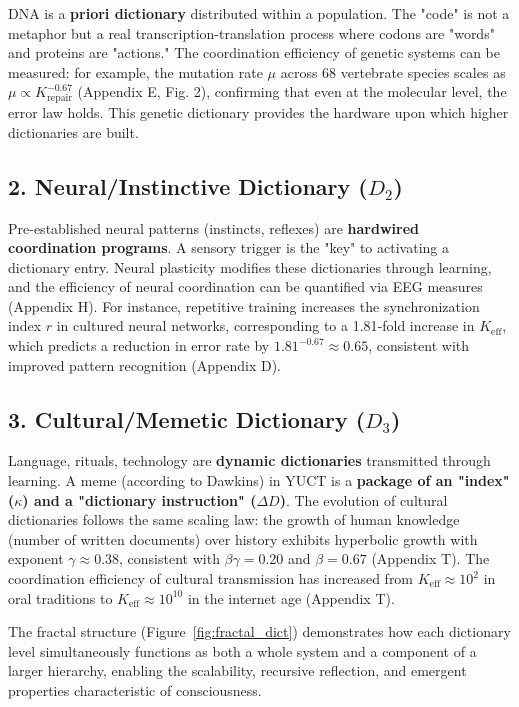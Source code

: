 \documentclass[12pt,a4paper]{article}
\newcommand{\eff}{\mathrm{eff}}
\newcommand{\Ke}{K_{\eff}}
\begin{document}
	DNA is a \textbf{priori dictionary} distributed within a population. The "code" is not a metaphor but a real transcription-translation process where codons are "words" and proteins are "actions." The coordination efficiency of genetic systems can be measured: for example, the mutation rate $\mu$ across 68 vertebrate species scales as $\mu \propto K_{\text{repair}}^{-0.67}$ (Appendix E, Fig. 2), confirming that even at the molecular level, the error law holds. This genetic dictionary provides the hardware upon which higher dictionaries are built.
	
	\subsection{2. Neural/Instinctive Dictionary ($D_2$)}
	
	Pre-established neural patterns (instincts, reflexes) are \textbf{hardwired coordination programs}. A sensory trigger is the "key" to activating a dictionary entry. Neural plasticity modifies these dictionaries through learning, and the efficiency of neural coordination can be quantified via EEG measures (Appendix H). For instance, repetitive training increases the synchronization index $r$ in cultured neural networks, corresponding to a 1.81‑fold increase in $\Ke$, which predicts a reduction in error rate by $1.81^{-0.67} \approx 0.65$, consistent with improved pattern recognition (Appendix D).
	
	\subsection{3. Cultural/Memetic Dictionary ($D_3$)}
	
	Language, rituals, technology are \textbf{dynamic dictionaries} transmitted through learning. A meme (according to Dawkins) in YUCT is a \textbf{package of an "index" ($\kappa$) and a "dictionary instruction" ($\Delta D$)}. The evolution of cultural dictionaries follows the same scaling law: the growth of human knowledge (number of written documents) over history exhibits hyperbolic growth with exponent $\gamma \approx 0.38$, consistent with $\beta\gamma = 0.20$ and $\beta = 0.67$ (Appendix T). The coordination efficiency of cultural transmission has increased from $\Ke \approx 10^2$ in oral traditions to $\Ke \approx 10^{10}$ in the internet age (Appendix T).
	
	The fractal structure (Figure~\ref{fig:fractal_dict}) demonstrates how each dictionary level simultaneously functions as both a whole system and a component of a larger hierarchy, enabling the scalability, recursive reflection, and emergent properties characteristic of consciousness.
	
\end{document}
